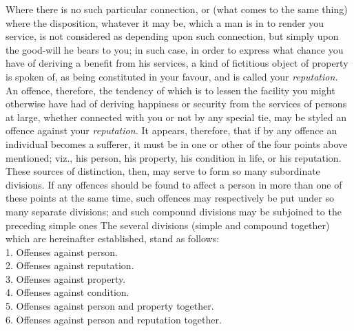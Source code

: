 \documentclass[12pt]{report}
\begin{document}
Where there is no such particular connection, or (what comes to the same
thing) where the disposition, whatever it may be, which a man is in to
render you service, is not considered as depending upon such connection,
but simply upon the good-will he bears to you; in such case, in order to
express what chance you have of deriving a benefit from his services, a
kind of fictitious object of property is spoken of, as being constituted
in your favour, and is called your \emph{reputation.} An offence,
therefore, the tendency of which is to lessen the facility you might
otherwise have had of deriving happiness or security from the services
of persons at large, whether connected with you or not by any special
tie, may be styled an offence against your \emph{reputation.} It
appears, therefore, that if by any offence an individual becomes a
sufferer, it must be in one or other of the four points above mentioned;
viz., his person, his property, his condition in life, or his
reputation. These sources of distinction, then, may serve to form so
many subordinate divisions. If any offences should be found to affect a
person in more than one of these points at the same time, such offences
may respectively be put under so many separate divisions; and such
compound divisions may be subjoined to the preceding simple ones The
several divisions (simple and compound together) which are hereinafter
established, stand as follows:\\
1. Offenses against person.\\
2. Offenses against reputation.\\
3. Offenses against property.\\
4. Offenses against condition.\\
5. Offenses against person and property together.\\
6. Offenses against person and reputation together.
\end{document}
